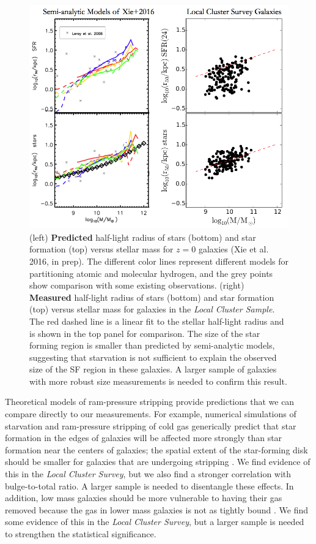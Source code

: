 \documentclass[11pt, preprint]{aastex}
\begin{document}
{\begin{figure}[h!]
\begin{center}
\includegraphics[width=.85\textwidth]{lizhi_comparison.png}
\end{center}
\caption{\small (left) {\bf Predicted} half-light radius
  of stars (bottom) and star formation (top) versus stellar mass for
  $z = 0 $ galaxies (Xie et al. 2016, in prep).
  The different color lines represent different models for partitioning
  atomic and molecular hydrogen, and the grey points show comparison
  with some existing observations.  
(right) {\bf Measured} half-light radius of stars (bottom) and star
formation (top) versus stellar mass for galaxies in the {\it Local Cluster Sample}.  The
red dashed line is a linear fit to the stellar half-light radius and
is shown in the top panel for comparison.  The size of the star
forming region is smaller than predicted by semi-analytic models,
suggesting that starvation is not sufficient to explain the observed
size of the SF region in these galaxies.  A larger sample of galaxies
with more robust size measurements is needed to confirm this result.}
\label{lizhi_comparison}
\end{figure}



Theoretical models of ram-pressure stripping provide predictions that
we can compare directly to our measurements.
For example, numerical simulations of starvation and ram-pressure stripping of cold gas 
generically predict that star formation in the edges
of galaxies will be affected more strongly than star formation near the
centers of galaxies; the spatial extent of the star-forming disk
should be smaller for galaxies that are undergoing stripping \citep[e.g.][]{kawata08, bekki14}.
We find evidence of this in the {\it Local Cluster Survey}, but we
also find a stronger correlation with bulge-to-total ratio.  A larger
sample is needed to disentangle these effects.
In addition, low mass galaxies should be more
vulnerable to having their gas removed 
because the gas in lower mass galaxies is not as tightly
bound \citep[e.g.][]{kawata08, mccarthy07, bekki14}.  We find
some evidence of this in the {\it Local Cluster Survey}, but a larger
sample is needed to strengthen the statistical significance. 

}
\end{document}
